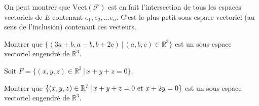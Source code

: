\documentclass[a4paper,10pt]{report}
\begin{document}
\begin{Demonstration}{}
\vspace{6cm}
\end{Demonstration}

\begin{Remarque}{} On peut montrer que $\textrm{Vect}(\mathcal{F})$ est en fait l'intersection de tous les espaces vectoriels de $E$ contenant $e_1, e_2, \ldots e_n$. C'est le plus petit sous-espace vectoriel (au sens de l'inclusion) contenant ces vecteurs.
\end{Remarque}

\medskip

\begin{ApplicationDirecte} Montrer que $\lbrace (3a+b,a-b,b+2c) \, \vert \, (a,b,c) \in \mathbb{R}^3 \rbrace$ est un sous-espace vectoriel engendré de $\mathbb{R}^3$.
\end{ApplicationDirecte}

\begin{Exemple} Soit $F = \lbrace (x,y,z) \in \mathbb{R}^3 \,  \vert \, x+y+z= 0 \rbrace.$ 

\vspace{3cm}

\end{Exemple}

\begin{ApplicationDirecte} Montrer que $\lbrace (x,y,z)  \in \mathbb{R}^3 \, \vert \, x+y+z=0 \hbox{ et } x+2y=0\rbrace$ est un sous-espace vectoriel engendré de $\mathbb{R}^3$.
\end{ApplicationDirecte}
\end{document}
